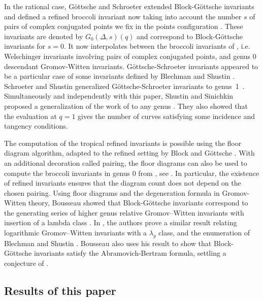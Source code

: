 In the rational case, Göttsche and Schroeter extended Block-Göttsche invariants and  defined a refined broccoli invariant now taking into account the number $s$ of pairs of complex conjugated points we fix in the points configuration \cite{gottsche_refined_2019}. These invariants are denoted by $G_0(\Delta,s)(q)$ and correspond to Block-Göttsche invariants for $s=0$. It now interpolates between the broccoli invariants of \cite{gathmann-2013-broccoli}, i.e.  Welschinger invariants involving pairs of complex conjugated points, and genus $0$ descendant Gromov-Witten invariants.  Göttsche-Schroeter invariants appeared to be a particular case of some invariants defined by Blechman and Shustin \cite{blechman-2019-refined}.
Schroeter and Shustin generalized Göttsche-Schroeter invariants to genus~1~\cite{schroeter-2018-refined}. Simultaneously and independently with this paper, Shustin and Sinichkin proposed a generalization of the work of \cite{schroeter-2018-refined} to any genus \cite{shustin-2024-refined}. They also showed that the evaluation at $q = 1$ gives the number of curves satisfying some incidence and tangency conditions.


The computation of the tropical refined invariants is possible using the floor diagram algorithm, adapted to the refined setting by Block and Göttsche \cite{block_refined_2016}. With an additional decoration called pairing, the floor diagrams can also be used to compute the broccoli invariants in genus $0$ from \cite{gottsche_refined_2019}, see \cite{brugalle_polynomiality_2022}. In particular, the existence of refined invariants ensures that the diagram count does not depend on the chosen pairing. 
Using floor diagrams and the degeneration formula in Gromov-Witten theory, Bousseau showed that Block-Göttsche invariants correspond to the generating series of higher genus relative Gromov–Witten invariants with insertion of a lambda class \cite{bousseau_refined_2021}.
In \cite{kennedyhunt-2024-tropical}, the authors prove a similar result relating logarithmic Gromov–Witten invariants with a $\lambda_g$ class, and the enumeration of Blechman and Shustin \cite{blechman-2019-refined}. 
Bousseau also uses his result to show that  
Block-Göttsche invariants satisfy the Abramovich-Bertram formula, settling a conjecture of \cite{brugalle-2020-invariance}. 





\subsection{Results of this paper}



